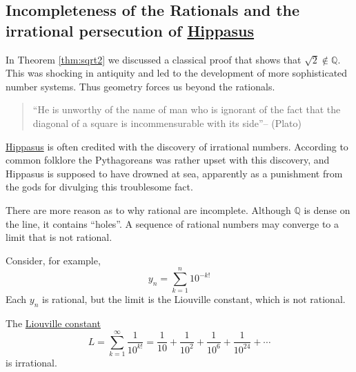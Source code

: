 \subsection{Incompleteness of the Rationals and the irrational persecution of \href{https://en.wikipedia.org/wiki/Hippasus}{Hippasus}}

In Theorem \ref{thm:sqrt2} we discussed a  classical proof  that shows that $\sqrt{2}\notin \mathbb{Q}$. This was shocking in antiquity and led to the development of more sophisticated number systems. Thus geometry forces us beyond the rationals.

\begin{quote}
``He is unworthy of the name of man who is ignorant of the fact that the diagonal of a square is incommensurable with its side''\quad -- (Plato)
\end{quote}

\href{https://en.wikipedia.org/wiki/Hippasus}{Hippasus} is often credited with the discovery of irrational numbers. According to common folklore the Pythagoreans was rather upset with this discovery, and Hippasus is supposed to have drowned at sea, apparently as a punishment from the gods for divulging this troublesome fact.

There are more reason as to why rational are incomplete. Although $\mathbb{Q}$ is dense on the line, it contains ``holes''. A sequence of rational numbers may converge to a limit that is not rational.

Consider, for example,
\[
y_n = \sum_{k=1}^n 10^{-k!}
\]
Each $y_n$ is rational, but the limit is the Liouville constant, which is not rational.

\begin{theorem}
The \href{https://en.wikipedia.org/wiki/Liouville\_number}{Liouville constant}
\[
L = \sum_{k=1}^{\infty} \frac{1}{10^{k!}}
= \frac{1}{10}+\frac{1}{10^{2}}+\frac{1}{10^{6}}+\frac{1}{10^{24}}+\cdots
\]
is irrational.
\end{theorem}

